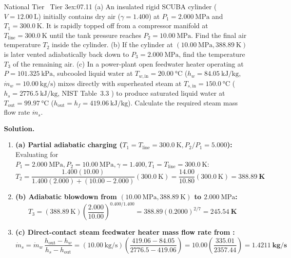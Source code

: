 \begin{workedexample}{National Tier \textbar\ Tier 3}{ex:07.11}
(a) An insulated rigid SCUBA cylinder ($V = \SI{12.00}{\liter}$) initially contains dry air ($\gamma = 1.400$) at $P_1 = \SI{2.000}{\mega\pascal}$ and $T_1 = \SI{300.0}{\kelvin}$. It is rapidly topped off from a compressor manifold at $T_{\mathrm{line}} = \SI{300.0}{\kelvin}$ until the tank pressure reaches $P_2 = \SI{10.00}{\mega\pascal}$. Find the final air temperature $T_2$ inside the cylinder. (b) If the cylinder at $(\SI{10.00}{\mega\pascal}, \SI{388.89}{\kelvin})$ is later vented adiabatically back down to $P_3 = \SI{2.000}{\mega\pascal}$, find the temperature $T_3$ of the remaining air. (c) In a power-plant open feedwater heater operating at $P = \SI{101.325}{\kilo\pascal}$, subcooled liquid water at $T_{w,\mathrm{in}} = \SI{20.00}{\celsius}$ ($h_w = \SI{84.05}{\kilo\joule\per\kilogram}$, $\dot{m}_w = \SI{10.00}{\kilogram\per\second}$) mixes directly with superheated steam at $T_{s,\mathrm{in}} = \SI{150.0}{\celsius}$ ($h_s = \SI{2776.5}{\kilo\joule\per\kilogram}$, NIST Table~3.3 ) to produce saturated liquid water at $T_{\mathrm{out}} = \SI{99.97}{\celsius}$ ($h_{\mathrm{out}} = h_f = \SI{419.06}{\kilo\joule\per\kilogram}$). Calculate the required steam mass flow rate $\dot{m}_s$.
\par\smallskip\noindent
\textbf{Solution.}
\begin{enumerate}
  \item \textbf{(a) Partial adiabatic charging ($T_1 = T_{\mathrm{line}} = \SI{300.0}{\kelvin}, P_2/P_1 = 5.000$):}
  Evaluating  for $P_1 = \SI{2.000}{\mega\pascal}, P_2 = \SI{10.00}{\mega\pascal}, \gamma = 1.400, T_1 = T_{\mathrm{line}} = \SI{300.0}{\kelvin}$:
  \[
    T_2 = \frac{1.400(10.00)}{1.400(2.000) + (10.00 - 2.000)}(\SI{300.0}{\kelvin}) = \frac{14.00}{10.80}(\SI{300.0}{\kelvin}) = \mathbf{\SI{388.89}{\kelvin}}
  \]
  \item \textbf{(b) Adiabatic blowdown from $(\SI{10.00}{\mega\pascal}, \SI{388.89}{\kelvin})$ to $\SI{2.000}{\mega\pascal}$:}
  \[
    T_3 = (\SI{388.89}{\kelvin})\left(\frac{2.000}{10.00}\right)^{0.400/1.400} = 388.89(0.2000)^{2/7} = \mathbf{\SI{245.54}{\kelvin}}
  \]
  \item \textbf{(c) Direct-contact steam feedwater heater mass flow rate from :}
  \[
    \dot{m}_s = \dot{m}_w\,\frac{h_{\mathrm{out}} - h_w}{h_s - h_{\mathrm{out}}} = (\SI{10.00}{\kilogram\per\second})\left(\frac{419.06 - 84.05}{2776.5 - 419.06}\right) = 10.00\left(\frac{335.01}{2357.44}\right) = \mathbf{\SI{1.4211}{\kilogram\per\second}}
  \]
\end{enumerate}
\end{workedexample}

